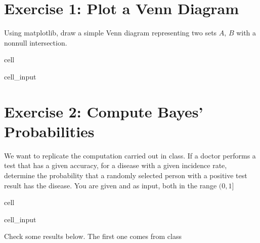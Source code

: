 \documentclass[letterpaper,10pt,english]{jupyterBook}
\begin{document}
\section{Exercise 1: Plot a Venn Diagram}
\label{\detokenize{lessons/Bayes_Theorem_Student:exercise-1-plot-a-venn-diagram}}
\sphinxAtStartPar
Using matplotlib, draw a simple Venn diagram representing two sets \(A\), \(B\) with a non\sphinxhyphen{}null intersection.

\begin{sphinxuseclass}{cell}\begin{sphinxVerbatimInput}

\begin{sphinxuseclass}{cell_input}
\begin{sphinxVerbatim}[commandchars=\\\{\}]
\end{sphinxVerbatim}

\end{sphinxuseclass}\end{sphinxVerbatimInput}

\end{sphinxuseclass}

\section{Exercise 2: Compute Bayes’ Probabilities}
\label{\detokenize{lessons/Bayes_Theorem_Student:exercise-2-compute-bayes-probabilities}}
\sphinxAtStartPar
We want to replicate the computation carried out in class. If a doctor performs a test that has a given accuracy, for a disease with a given incidence rate, determine the probability that a randomly selected person with a positive test result has the disease. You are given  and  as input, both in the range \((0,1]\)

\begin{sphinxuseclass}{cell}\begin{sphinxVerbatimInput}

\begin{sphinxuseclass}{cell_input}
\begin{sphinxVerbatim}[commandchars=\\\{\}]
  
     
\end{sphinxVerbatim}

\end{sphinxuseclass}\end{sphinxVerbatimInput}

\end{sphinxuseclass}
\sphinxAtStartPar
Check some results below. The first one comes from class
\end{document}
